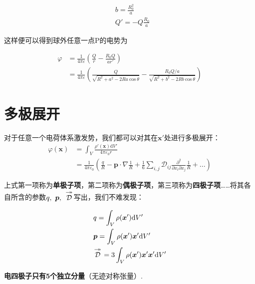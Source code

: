 \documentclass[main.tex]{subfiles}
\begin{document}
\begin{align}
    &b = \frac{R_0^2}{a}\\
    &Q' = -Q\frac{R_0}{a}
\end{align}

这样便可以得到球外任意一点P的电势为

\begin{align}
    \varphi &= \frac{1}{4\pi \varepsilon } \left(\frac{Q}{r} - \frac{R_0Q}{ar'} \right)\nonumber\\
    & = \frac{1}{4\pi \varepsilon } \left(\frac{Q}{\sqrt{R^2+a^2-2Ra\ \mathrm{cos}\ \theta}} - \frac{R_0Q/a}{\sqrt{R^2+b^2-2Rb\ \mathrm{cos}\ \theta}} \right)
\end{align}

\section{多极展开}
对于任意一个电荷体系激发势，我们都可以对其在$\boldsymbol{x}'$处进行多极展开：
\begin{align}
    \varphi(\boldsymbol{x})& = \int_{V}^{} \frac{\rho '(\boldsymbol{x})\mathrm{d}V'}{4\pi \varepsilon _0r}\\
    & = \frac{1}{4\pi \varepsilon _0}\left ( \frac{q}{R} - \boldsymbol{p} \cdot \nabla \frac{1}{R} + \frac{1}{6}\sum_{i,j}^{} \mathcal{D}_{ij}  \frac{\partial^2}{\partial x_i\partial x_j}\frac{1}{R} +... \right ) 
\end{align}

上式第一项称为\textbf{单极子项}，第二项称为\textbf{偶极子项}，第三项称为\textbf{四极子项}……将其各自所含的参数$q,\ \boldsymbol{p},\ {\substack{\displaystyle\twoheadrightarrow\atop\displaystyle{\mathcal{D}}\\[0.624em]~}}$写出，我们不难发现：
\begin{align}
    &q = \int_{V}^{} \rho (\boldsymbol{x}')\mathrm{d}V'\\
    &\boldsymbol{p} = \int_{V}^{} \rho (\boldsymbol{x}')\boldsymbol{x}' \mathrm{d}V'\\
    &{\substack{\displaystyle\twoheadrightarrow\atop\displaystyle{\mathcal{D}}\\[0.624em]~}}= 3 \int_{V}^{} \rho (\boldsymbol{x}')\boldsymbol{x}' \boldsymbol{x}' \mathrm{d}V'
\end{align}

\textbf{电四极子只有5个独立分量}（无迹对称张量）.
\end{document}
